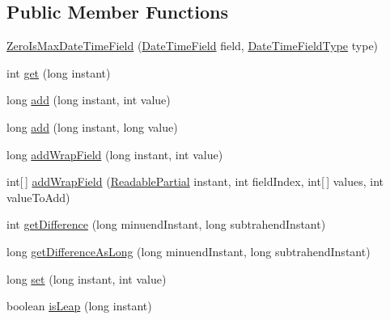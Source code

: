 \subsection*{Public Member Functions}
\begin{DoxyCompactItemize}
\item 
\hyperlink{classorg_1_1joda_1_1time_1_1field_1_1_zero_is_max_date_time_field_a48992c7bad37894b5af44afca9347590}{Zero\-Is\-Max\-Date\-Time\-Field} (\hyperlink{classorg_1_1joda_1_1time_1_1_date_time_field}{Date\-Time\-Field} field, \hyperlink{classorg_1_1joda_1_1time_1_1_date_time_field_type}{Date\-Time\-Field\-Type} type)
\item 
int \hyperlink{classorg_1_1joda_1_1time_1_1field_1_1_zero_is_max_date_time_field_ae7e6180434e6e3a93a266951ce547d0f}{get} (long instant)
\item 
long \hyperlink{classorg_1_1joda_1_1time_1_1field_1_1_zero_is_max_date_time_field_af2f29bfd0556dc2bfb4782cfab9d9591}{add} (long instant, int value)
\item 
long \hyperlink{classorg_1_1joda_1_1time_1_1field_1_1_zero_is_max_date_time_field_ac73e05a75e190809f8d3705f819b8582}{add} (long instant, long value)
\item 
long \hyperlink{classorg_1_1joda_1_1time_1_1field_1_1_zero_is_max_date_time_field_a96c6461d093a244a544683d5177ae4f5}{add\-Wrap\-Field} (long instant, int value)
\item 
int\mbox{[}$\,$\mbox{]} \hyperlink{classorg_1_1joda_1_1time_1_1field_1_1_zero_is_max_date_time_field_a4a30b7516a27443ad9bd75d397c1ef66}{add\-Wrap\-Field} (\hyperlink{interfaceorg_1_1joda_1_1time_1_1_readable_partial}{Readable\-Partial} instant, int field\-Index, int\mbox{[}$\,$\mbox{]} values, int value\-To\-Add)
\item 
int \hyperlink{classorg_1_1joda_1_1time_1_1field_1_1_zero_is_max_date_time_field_a96cc612efa5f9a0e0b622890ca60e044}{get\-Difference} (long minuend\-Instant, long subtrahend\-Instant)
\item 
long \hyperlink{classorg_1_1joda_1_1time_1_1field_1_1_zero_is_max_date_time_field_a2cf7b8f4e11c1957cb8cf23ebce9ac99}{get\-Difference\-As\-Long} (long minuend\-Instant, long subtrahend\-Instant)
\item 
long \hyperlink{classorg_1_1joda_1_1time_1_1field_1_1_zero_is_max_date_time_field_af04c39572f3c0c695b5238c5e62a2bd9}{set} (long instant, int value)
\item 
boolean \hyperlink{classorg_1_1joda_1_1time_1_1field_1_1_zero_is_max_date_time_field_a73675e8a9ba2da9f07b9bb5a351aeec7}{is\-Leap} (long instant)

\end{DoxyCompactItemize}
